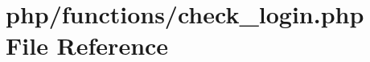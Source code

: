 \hypertarget{check__login_8php}{\section{php/functions/check\-\_\-login.php File Reference}
\label{check__login_8php}
}
